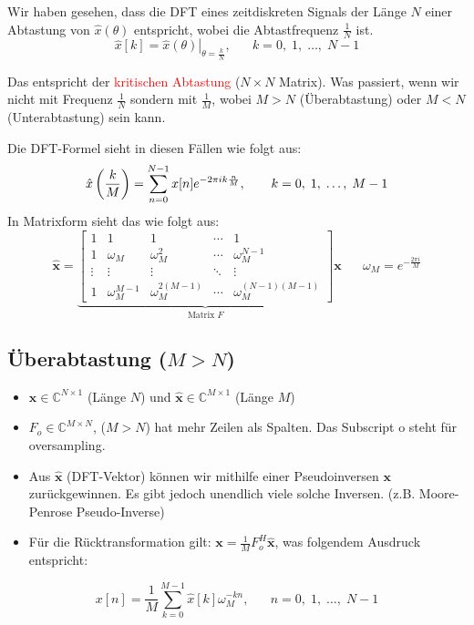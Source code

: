 \documentclass[11pt]{article}
\begin{document}
\pagebreak

Wir haben gesehen, dass die DFT eines zeitdiskreten Signals der Länge $N$ einer Abtastung von $\hat{x}(\theta)$ entspricht, wobei die Abtastfrequenz $\frac{1}{N}$ ist.
$$\hat{x}[k] = \left.\hat{x}(\theta)\right|_{\theta = \frac{k}{N}}, \hspace{20pt} k = 0, \; 1, \; \dots, \; N-1$$

Das entspricht der \textcolor{red}{kritischen Abtastung} ($N \times N$ Matrix). Was passiert, wenn wir nicht mit Frequenz $\frac{1}{N}$ sondern mit $\frac{1}{M}$, wobei $M > N$ (Überabtastung) oder $M < N$ (Unterabtastung) sein kann.

Die DFT-Formel sieht in diesen Fällen wie folgt aus:
\vspace*{-0.25cm}
$$\hat{x}\left(\frac{k}{M}\right) = \sum_{n=0}^{N-1}x[n]e^{-2 \pi i k \frac{n}{M}}, \hspace*{20pt} k = 0, \; 1, \; \dots, \; M-1$$
In Matrixform sieht das wie folgt aus:
$$\hat{\mathbf{x}} = \underbrace{\begin{bmatrix}
    1 & 1 & 1 & \cdots & 1 \\
    1 & \omega_M & \omega_M^2 & \cdots & \omega_M^{N-1} \\
    \vdots & \vdots & \vdots & \ddots & \vdots \\
    1 & \omega_M^{M-1} & \omega_M^{2(M-1)} & \cdots & \omega_M^{(N-1)(M-1)}
\end{bmatrix}}_{\text{Matrix }F} \mathbf{x} \hspace{20pt} \omega_M = e^{-\frac{2 \pi i}{M}}$$

\vspace*{-0.25cm}
\subsection*{Überabtastung ($M > N$)}
\vspace*{-0.5cm}
\begin{itemize}
    \item $\mathbf{x} \in \mathbb{C}^{N \times 1}$ (Länge $N$) und $\hat{\mathbf{x}} \in \mathbb{C}^{M \times 1}$ (Länge $M$)
    \item $F_o \in \mathbb{C}^{M\times N}$, ($M > N$) hat mehr Zeilen als Spalten. Das Subscript o steht für oversampling.
    \item Aus $\hat{\mathbf{x}}$ (DFT-Vektor) können wir mithilfe einer Pseudoinversen $\mathbf{x}$ zurückgewinnen. Es gibt jedoch unendlich viele solche Inversen. (z.B. Moore-Penrose Pseudo-Inverse)
    \item Für die Rücktransformation gilt: $\mathbf{x} = \displaystyle\frac{1}{M} F_o^H \hat{\mathbf{x}}$, was folgendem Ausdruck entspricht:
\end{itemize}
\vspace*{-0.5cm}
$$x[n] = \frac{1}{M} \sum_{k=0}^{M-1} \hat{x}[k]\omega_M^{-kn}, \hspace{20pt} n = 0, \; 1, \; \dots, \; N-1$$
\end{document}
